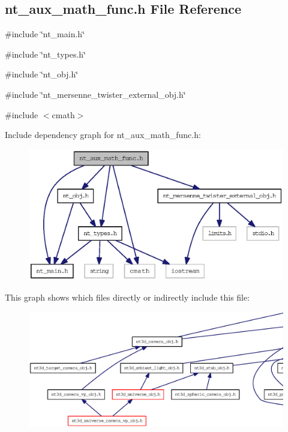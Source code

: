 \subsection{nt\_\-aux\_\-math\_\-func.h File Reference}
\label{nt__aux__math__func_8h}
{\ttfamily \#include \char`\"{}nt\_\-main.h\char`\"{}}\par
{\ttfamily \#include \char`\"{}nt\_\-types.h\char`\"{}}\par
{\ttfamily \#include \char`\"{}nt\_\-obj.h\char`\"{}}\par
{\ttfamily \#include \char`\"{}nt\_\-mersenne\_\-twister\_\-external\_\-obj.h\char`\"{}}\par
{\ttfamily \#include $<$cmath$>$}\par
Include dependency graph for nt\_\-aux\_\-math\_\-func.h:
\nopagebreak
\begin{figure}[H]
\begin{center}
\leavevmode
\includegraphics[width=400pt]{nt__aux__math__func_8h__incl}
\end{center}
\end{figure}
This graph shows which files directly or indirectly include this file:
\nopagebreak
\begin{figure}[H]
\begin{center}
\leavevmode
\includegraphics[width=400pt]{nt__aux__math__func_8h__dep__incl}
\end{center}
\end{figure}
